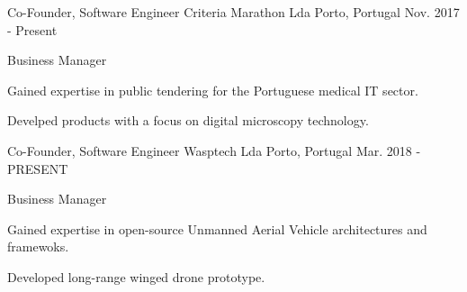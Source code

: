 

\begin{cventries}

  \cventry
    {Co-Founder, Software Engineer} %
    {Criteria Marathon Lda} %
    {Porto, Portugal} %
    {Nov. 2017 - Present} %
    {
      \begin{cvitems} %
        \item {Business Manager}
        \item {Gained expertise in public tendering for the Portuguese medical IT sector.}
        \item {Develped products with a focus on digital microscopy technology.}
      \end{cvitems}
    }

  \cventry
    {Co-Founder, Software Engineer} %
    {Wasptech  Lda} %
    {Porto, Portugal} %
    {Mar. 2018 - PRESENT} %
    {
      \begin{cvitems} %
        \item {Business Manager}
        \item {Gained expertise in open-source Unmanned Aerial Vehicle architectures and framewoks.}
        \item {Developed long-range winged drone prototype.}
      \end{cvitems}
    }

\end{cventries}
